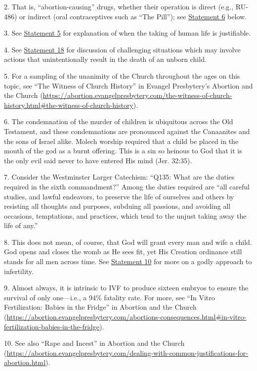 \documentclass[
]{book}
\begin{document}
2. That is, ``abortion-causing'' drugs, whether their operation is direct (e.g., RU-486) or indirect (oral contraceptives such as ``The Pill''); see \protect\hyperlink{statement-06}{Statement 6} below.

3. See \protect\hyperlink{statement-05}{Statement 5} for explanation of when the taking of human life is justifiable.

4. See \protect\hyperlink{statement-18}{Statement 18} for discussion of challenging situations which may involve actions that unintentionally result in the death of an unborn child.

5. For a sampling of the unanimity of the Church throughout the ages on this topic, see ``The Witness of Church History'' in
Evangel Presbytery's Abortion and the Church (\url{https://abortion.evangelpresbytery.com/the-witness-of-church-history.html\#the-witness-of-church-history}).

6. The condemnation of the murder of children is ubiquitous across the Old Testament, and these condemnations are pronounced against the Canaanites and the sons of Israel alike. Molech worship required that a child be placed in the mouth of the god as a burnt offering. This is a sin so heinous to God that it is the only evil said never to have entered His mind (Jer. 32:35).

7. Consider the Westminster Larger Catechism: ``Q135: What are the duties required in the sixth commandment?'' Among the duties required are ``all careful studies, and lawful endeavors, to preserve the life of ourselves and others by resisting all thoughts and purposes, subduing all passions, and avoiding all occasions, temptations, and practices, which tend to the unjust taking away the life of any.''

8. This does not mean, of course, that God will grant every man and wife a child. God opens and closes the womb as He sees fit, yet His Creation ordinance still stands for all men across time. See \protect\hyperlink{statement-10}{Statement 10} for more on a godly approach to infertility.

9. Almost always, it is intrinsic to IVF to produce sixteen embryos to ensure the survival of only one---i.e., a 94\% fatality rate. For more, see ``In Vitro Fertilization: Babies in the Fridge'' in Abortion and the Church (\url{https://abortion.evangelpresbytery.com/abortions-consequences.html\#in-vitro-fertilization-babies-in-the-fridge}).

10. See also ``Rape and Incest'' in Abortion and the Church (\url{https://abortion.evangelpresbytery.com/dealing-with-common-justifications-for-abortion.html}).
\end{document}
